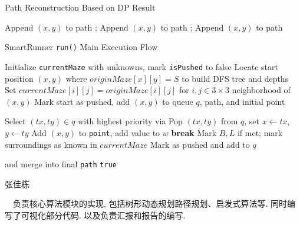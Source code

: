 \documentclass[10.5pt,compsoc]{CjC}
\theoremstyle{mystyle}
\begin{document}
\begin{CJK*}{UTF8}{song}
\begin{algorithm}
\caption{Path Reconstruction Based on DP Result}
\begin{algorithmic}[3]
    \State Append $(x,y)$ to path
            \State {}; Append $(x,y)$ to path
        \EndFor
            \State {}
        \EndFor
    \Else
            \State {}; Append $(x,y)$ to path
        \EndFor
    \EndIf
\EndFunction
\end{algorithmic}
\end{algorithm}

\begin{algorithm}
\caption{SmartRunner \texttt{run()} Main Execution Flow}
\begin{algorithmic}[4]
    \State Initialize \texttt{currentMaze} with unknowns, mark \texttt{isPushed} to false
    \State Locate start position $(x, y)$ where $originMaze[x][y] = S$
    \State {} to build DFS tree and depths
    \State Set $currentMaze[i][j] = originMaze[i][j]$ for $i, j \in 3 \times 3$ neighborhood of $(x, y)$
    \State Mark start as pushed, add $(x, y)$ to queue $q$, path, and initial point

        \State Select $(tx, ty) \in q$ with highest priority via 
        \State Pop $(tx, ty)$ from $q$, set $x \gets tx$, $y \gets ty$
        \State Add $(x, y)$ to \texttt{point}, add value to $w$
            \State \textbf{break}
        \EndIf
        \State Mark $B, L$ if met; mark surroundings as known in $currentMaze$
            \State Mark as pushed and add to $q$
        \EndFor
    \EndWhile

        \State {} and merge into final \texttt{path}
    \EndFor
    \State \Return \texttt{true}
\EndFunction
\end{algorithmic}
\end{algorithm}

\clearpage

\begin{biography}
\noindent
\begin{CJK*}{UTF8}{zhhei}张佳栋\end{CJK*}\ \
负责核心算法模块的实现, 包括树形动态规划路径规划、启发式算法等.
同时编写了可视化部分代码.
以及负责汇报和报告的编写.


\end{biography}
\end{CJK*}
\end{document}

